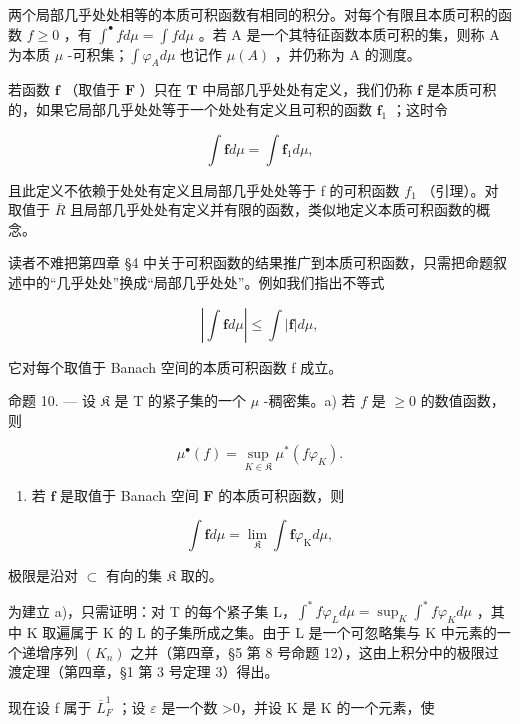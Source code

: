 两个局部几乎处处相等的本质可积函数有相同的积分。对每个有限且本质可积的函数 \(f \geqslant 0\) ，有 \(\int^{\bullet} f d\mu = \int f d\mu\) 。若 A 是一个其特征函数本质可积的集，则称 A 为本质 \(\mu\) -可积集；\(\int \varphi_{A} d\mu\) 也记作 \(\mu(A)\) ，并仍称为 A 的测度。

若函数 \(\mathbf{f}\) （取值于 \(\mathbf{F}\) ）只在 \(\mathbf{T}\) 中局部几乎处处有定义，我们仍称 \(\mathbf{f}\) 是本质可积的，如果它局部几乎处处等于一个处处有定义且可积的函数 \(\mathbf{f}_1\) ；这时令

\[
\int \mathbf {f} d \mu = \int \mathbf {f} _ {1} d \mu ,
\]

且此定义不依赖于处处有定义且局部几乎处处等于 f 的可积函数 \(f_{1}\) （引理）。对取值于 \(\overline{R}\) 且局部几乎处处有定义并有限的函数，类似地定义本质可积函数的概念。

读者不难把第四章 §4 中关于可积函数的结果推广到本质可积函数，只需把命题叙述中的“几乎处处”换成“局部几乎处处”。例如我们指出不等式

\[
\left| \int \mathbf {f} d \mu \right| \leqslant \int | \mathbf {f} | d \mu ,\tag{3}
\]

它对每个取值于 Banach 空间的本质可积函数 f 成立。

命题 10. --- 设 \(\mathfrak{K}\) 是 T 的紧子集的一个 \(\mu\) -稠密集。a) 若 \(f\) 是 \(\geqslant 0\) 的数值函数，则

\[
\mu^ {\bullet} (f) = \sup _ {K \in \mathfrak {K}} \mu^ {*} (f \varphi_ {K}).\tag{4}
\]

\begin{enumerate}
\def\labelenumi{\alph{enumi})}
\setcounter{enumi}{1}
\tightlist
\item
  若 \(\mathbf{f}\) 是取值于 Banach 空间 \(\mathbf{F}\) 的本质可积函数，则
\end{enumerate}

\[
\int \mathbf {f} d \mu = \lim _ {\mathfrak {K}} \int \mathbf {f} \varphi_ {\mathrm{K}} d \mu ,
\]

极限是沿对 \(\subset\) 有向的集 \(\mathfrak{K}\) 取的。

为建立 a)，只需证明：对 T 的每个紧子集 L，\(\int^{*}f\varphi_{L}d\mu=\sup_{K}\int^{*}f\varphi_{K}d\mu\) ，其中 K 取遍属于 K 的 L 的子集所成之集。由于 L 是一个可忽略集与 K 中元素的一个递增序列 \((K_{n})\) 之并（第四章，§5 第 8 号命题 12），这由上积分中的极限过渡定理（第四章，§1 第 3 号定理 3）得出。

现在设 f 属于 \(\overline{L}_{F}^{1}\) ；设 \(\varepsilon\) 是一个数 \textgreater0，并设 K 是 K 的一个元素，使

